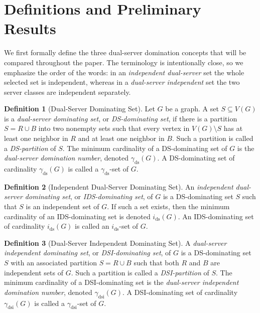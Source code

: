 \documentclass[11pt]{article}
\theoremstyle{definition}
\newtheorem{definition}{Definition}
\theoremstyle{remark}
\newcommand{\ds}{\mathrm{ds}}
\newcommand{\dsi}{\mathrm{dsi}}
\begin{document}
\section{Definitions and Preliminary Results}
\label{sect:defn}

We first formally define the three dual-server domination concepts that will be compared throughout
the paper. The terminology is intentionally close, so we emphasize the order
of the words: in an \emph{independent dual-server} set the whole selected set
is independent, whereas in a \emph{dual-server independent} set the two
server classes are independent separately. 

\begin{definition}[Dual-Server Dominating Set]  
Let $G$ be a graph.
 A set \(S\subseteq V(G)\) is a
\emph{dual-server dominating set}, or \emph{DS-dominating set}, if there is a
partition \(S=R\cup B\) into two nonempty sets such that every vertex in
\(V(G) \setminus S\) has at least one neighbor in \(R\) and at least one
neighbor in \(B\). Such a partition is called a
\emph{DS-partition} of \(S\).  The minimum cardinality of a DS-dominating set of \(G\) is
the \emph{dual-server domination number}, denoted \(\gamma_{\ds}(G)\). A
DS-dominating set of cardinality \(\gamma_{\ds}(G)\) is called a
\(\gamma_{\ds}\)-set of \(G\). 
\end{definition}

\begin{definition}[Independent Dual-Server Dominating Set]
An \emph{independent dual-server dominating set}, or \emph{IDS-dominating
set}, of \(G\) is a DS-dominating set \(S\) such that \(S\) is an independent
set of \(G\). If such a set exists, then the minimum cardinality of an
IDS-dominating set is denoted \(i_{\ds}(G)\). An IDS-dominating set of
cardinality \(i_{\ds}(G)\) is called an \(i_{\ds}\)-set of \(G\).
\end{definition}

\begin{definition}[Dual-Server Independent Dominating Set]
A \emph{dual-server independent dominating set}, or \emph{DSI-dominating
set}, of \(G\) is a DS-dominating set \(S\) with an associated partition
\(S=R\cup B\) such that both \(R\) and \(B\) are independent sets of \(G\). Such a
partition is called a \emph{DSI-partition} of \(S\).
The minimum cardinality of a DSI-dominating set is the
\emph{dual-server independent domination number}, denoted
\(\gamma_{\dsi}(G)\). A DSI-dominating set of cardinality
\(\gamma_{\dsi}(G)\) is called a \(\gamma_{\dsi}\)-set of \(G\). 
\end{definition}
\end{document}
